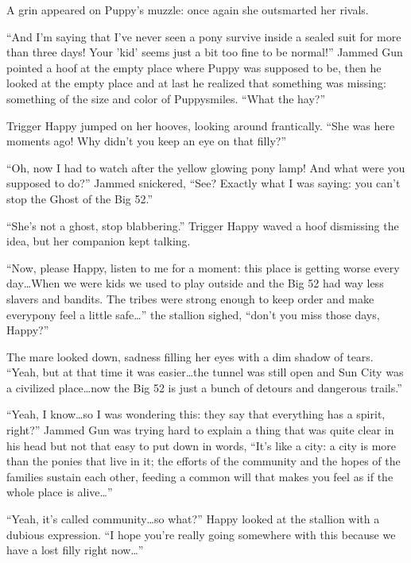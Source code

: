 A grin appeared on Puppy's muzzle: once again she outsmarted her rivals.

\horizonline


``And I'm saying that I've never seen a pony survive inside a sealed suit for more than three days! Your 'kid' seems just a bit too fine to be normal!'' Jammed Gun pointed a hoof at the empty place where Puppy was supposed to be, then he looked at the empty place and at last he realized that something was missing: something of the size and color of Puppysmiles. ``What the hay?''

Trigger Happy jumped on her hooves, looking around frantically. ``She was here moments ago! Why didn't you keep an eye on that filly?''

``Oh, now I had to watch after the yellow glowing pony lamp! And what were you supposed to do?'' Jammed snickered, ``See? Exactly what I was saying: you can't stop the Ghost of the Big 52.''

``She's not a ghost, stop blabbering.'' Trigger Happy waved a hoof dismissing the idea, but her companion kept talking.

``Now, please Happy, listen to me for a moment: this place is getting worse every day\dots When we were kids we used to play outside and the Big 52 had way less slavers and bandits. The tribes were strong enough to keep order and make everypony feel a little safe\dots'' the stallion sighed, ``don't you miss those days, Happy?''

The mare looked down, sadness filling her eyes with a dim shadow of tears. ``Yeah, but at that time it was easier\dots the tunnel was still open and Sun City was a civilized place\dots now the Big 52 is just a bunch of detours and dangerous trails.''

``Yeah, I know\dots so I was wondering this: they say that everything has a spirit, right?'' Jammed Gun was trying hard to explain a thing that was quite clear in his head but not that easy to put down in words, ``It's like a city: a city is more than the ponies that live in it; the efforts of the community and the hopes of the families sustain each other, feeding a common will that makes you feel as if the whole place is alive\dots''

``Yeah, it's called community\dots so what?'' Happy looked at the stallion with a dubious expression. ``I hope you're really going somewhere with this because we have a lost filly right now\dots''

